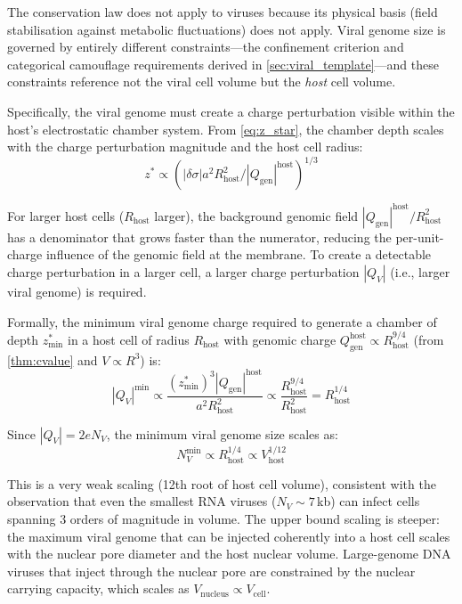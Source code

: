 \documentclass[11pt,twocolumn,a4paper]{article}
\theoremstyle{definition}
\theoremstyle{remark}
\newcommand{\Qgen}{Q_{\mathrm{gen}}}
\newcommand{\abs}[1]{\left|#1\right|}
\newcommand{\zstar}{z^{*}}
\begin{document}
The conservation law does not apply to viruses because its physical basis (field stabilisation against metabolic fluctuations) does not apply. Viral genome size is governed by entirely different constraints---the confinement criterion and categorical camouflage requirements derived in \cref{sec:viral_template}---and these constraints reference not the viral cell volume but the \emph{host} cell volume.

Specifically, the viral genome must create a charge perturbation visible within the host's electrostatic chamber system. From \cref{eq:z_star}, the chamber depth scales with the charge perturbation magnitude and the host cell radius:
\begin{equation}
  \zstar \propto \left(\abs{\delta\sigma} a^2 R_{\mathrm{host}}^2 / \abs{\Qgen}^{\mathrm{host}}\right)^{1/3}
\end{equation}

For larger host cells ($R_{\mathrm{host}}$ larger), the background genomic field $\abs{\Qgen}^{\mathrm{host}} / R_{\mathrm{host}}^2$ has a denominator that grows faster than the numerator, reducing the per-unit-charge influence of the genomic field at the membrane. To create a detectable charge perturbation in a larger cell, a larger charge perturbation $\abs{Q_V}$ (i.e., larger viral genome) is required.

Formally, the minimum viral genome charge required to generate a chamber of depth $z^{*}_{\mathrm{min}}$ in a host cell of radius $R_{\mathrm{host}}$ with genomic charge $\Qgen^{\mathrm{host}} \propto R_{\mathrm{host}}^{9/4}$ (from \cref{thm:cvalue} and $V \propto R^3$) is:
\begin{equation}
  \abs{Q_V}^{\mathrm{min}} \propto \frac{(z^{*}_{\mathrm{min}})^3 \abs{\Qgen}^{\mathrm{host}}}{a^2 R_{\mathrm{host}}^2} \propto \frac{R_{\mathrm{host}}^{9/4}}{R_{\mathrm{host}}^2} = R_{\mathrm{host}}^{1/4}
\end{equation}

Since $\abs{Q_V} = 2e N_V$, the minimum viral genome size scales as:
\begin{equation}
  N_V^{\mathrm{min}} \propto R_{\mathrm{host}}^{1/4} \propto V_{\mathrm{host}}^{1/12}
\end{equation}

This is a very weak scaling (12th root of host cell volume), consistent with the observation that even the smallest RNA viruses ($N_V \sim 7$\,kb) can infect cells spanning 3 orders of magnitude in volume. The upper bound scaling is steeper: the maximum viral genome that can be injected coherently into a host cell scales with the nuclear pore diameter and the host nuclear volume. Large-genome DNA viruses that inject through the nuclear pore are constrained by the nuclear carrying capacity, which scales as $V_{\mathrm{nucleus}} \propto V_{\mathrm{cell}}$.
\end{document}
